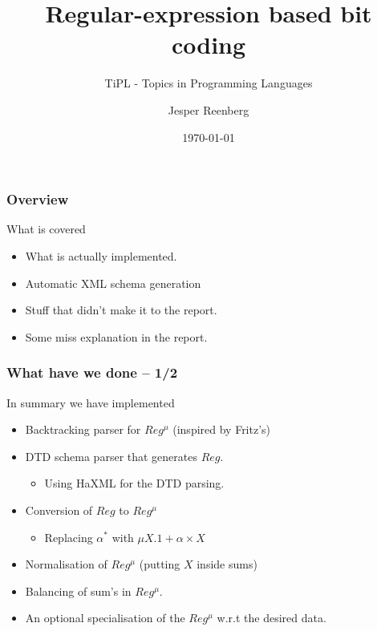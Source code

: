 \documentclass[slidestop,compress,mathserif, xcolor=table]{beamer}
\title[]{Regular-expression based bit coding}
\subtitle{\tiny{TiPL - Topics in Programming Languages}}
\author{Jesper Reenberg}
\institute[DIKU]{Department of Computer Science}
\date[]{\today}
\begin{document}
\frame[plain]{\titlepage}


\begin{frame}
  \frametitle{Overview}

  What is covered

  \begin{itemize}
  \item What is actually implemented.

  \item Automatic XML schema generation

  \item Stuff that didn't make it to the report.

  \item Some miss explanation in the report.
  \end{itemize}
\end{frame}


\begin{frame}[c]
  \frametitle{What have we done -- 1/2}

  In summary we have implemented

  \begin{itemize}
  \item Backtracking parser for $Reg^\mu$ (inspired by Fritz's)

  \item DTD schema parser that generates $Reg$.
    \begin{itemize}
    \item Using HaXML for the DTD parsing.
    \end{itemize}

  \item Conversion of $Reg$ to $Reg^\mu$
    \begin{itemize}
    \item Replacing $\alpha^\ast$ with $\mu X . 1 + \alpha \times X$
    \end{itemize}

  \item Normalisation of $Reg^\mu$ (putting $X$ inside sums)

  \item Balancing of sum's in $Reg^\mu$.

  \item An optional specialisation of the $Reg^\mu$ w.r.t the desired data.

  \end{itemize}
\end{frame}
\end{document}
